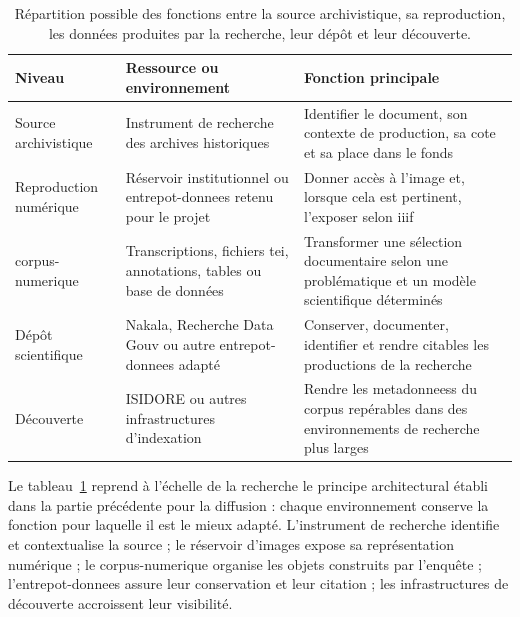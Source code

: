 \begin{table}[htbp]
	\centering
	\small
	\begin{tabular}{p{} p{} p{}}
		\toprule
		\textbf{Niveau} &
		\textbf{Ressource ou environnement} &
		\textbf{Fonction principale} \\
		\midrule
		
		Source archivistique
		& Instrument de recherche des archives historiques
		& Identifier le document, son contexte de production, sa cote et sa place dans le fonds \\
		
		Reproduction numérique
		& Réservoir institutionnel ou \gls{entrepot-donnees} retenu pour le projet
		& Donner accès à l'image et, lorsque cela est pertinent, l'exposer selon \gls{iiif} \\
		
		\Gls{corpus-numerique}
		& Transcriptions, fichiers \gls{tei}, annotations, tables ou base de données
		& Transformer une sélection documentaire selon une problématique et un modèle scientifique déterminés \\
		
		Dépôt scientifique
		& Nakala, Recherche Data Gouv ou autre \gls{entrepot-donnees} adapté
		& Conserver, documenter, identifier et rendre citables les productions de la recherche \\
		
		Découverte
		& ISIDORE ou autres infrastructures d'indexation
		& Rendre les \glspl{metadonnees} du corpus repérables dans des environnements de recherche plus larges \\
		
		\bottomrule
	\end{tabular}
	
	\caption[Répartition fonctionnelle des ressources d'un corpus numérique]
	{Répartition possible des fonctions entre la source archivistique, sa reproduction, les données produites par la recherche, leur dépôt et leur découverte.}
	\label{tab:chaine-donnees-recherche}
\end{table}

Le tableau~\ref{tab:chaine-donnees-recherche} reprend à l'échelle de la recherche le principe architectural établi dans la partie précédente pour la diffusion : chaque environnement conserve la fonction pour laquelle il est le mieux adapté. L'instrument de recherche identifie et contextualise la source ; le réservoir d'images expose sa représentation numérique ; le \gls{corpus-numerique} organise les objets construits par l'enquête ; l'\gls{entrepot-donnees} assure leur conservation et leur citation ; les infrastructures de découverte accroissent leur visibilité.

